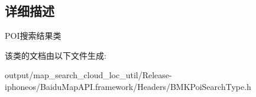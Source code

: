 \subsection{详细描述}
P\+O\+I搜索结果类 

该类的文档由以下文件生成\+:\begin{DoxyCompactItemize}
\item 
output/map\+\_\+search\+\_\+cloud\+\_\+loc\+\_\+util/\+Release-\/iphoneos/\+Baidu\+Map\+A\+P\+I.\+framework/\+Headers/B\+M\+K\+Poi\+Search\+Type.\+h\end{DoxyCompactItemize}
